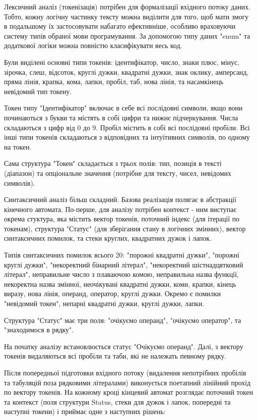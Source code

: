 \documentclass[14pt, a4paper]{extreport}
\begin{document}
	Лексичний аналіз (токенізація) потрібен для формалізації вхідного потоку даних. Тобто, кожну логічну частинку тексту можна виділити для того, щоб мати змогу в подальшому їх застосовувати набагато ефективніше, особливо враховуючи систему типів обраної мови програмування. За допомогою типу даних "enum" та додаткової логіки можна повністю класифікувати весь код.
	
	Були виділені основні типи токенів: ідентифікатор, число, знаки плюс, мінус, зірочка, слеш, відсоток, круглі дужки, квадратні дужки, знак оклику, амперсанд, пряма лінія, крапка, кома, лапки, пробіл, таб, нова лінія, та насамкінець невідомий тип токену.
	
	Токен типу "Ідентифікатор" включає в себе всі послідовні символи, якщо вони починаються з букви та містять в собі цифри та нижнє підчеркування. Числа складаються з цифр від 0 до 9. Пробіл містить в собі всі послідовні пробіли. Всі інші типи токенів складаються з відповідних та інтуїтивних символів, по одному на токен.
	
	Сама структура "Токен" складається з трьох полів: тип, позиція в тексті (діапазон) та опціональне значення (потрібне для тексту, чисел, невідомих символів).
	
	Синтаксичний аналіз більш складний. Базова реалізація полягає в абстракції кінечного автомата. По-перше, для аналізу потрібен контекст - ним виступає окрема стуктура, яка містить вектор токенів, поточний індекс (для ітерації по токенам), структура "Статус" (для зберігання стану в логічних змінних), вектор синтаксичних помилок, та стеки круглих, квадратних дужок і лапок.
	
	Типів синтаксичних помилок всього 20: "порожні квадратні дужки", "порожні круглі дужки", "некоректний бінарний літерал", "некоректний шістнадцятковий літерал", неправильне число з плаваючою комою, неправильна назва функції, некоректна назва змінної, неочікувані квадратні дужки, коми, крапки, кінець виразу, нова лінія, операнд, оператор, круглі дужки. Окремо є помилки "невідомий токен", непарні квадратні дужки, круглі дужки, лапки.
	
	Структура "Статус" має три поля: "очікуємо операнд", "очікуємо оператор", та "знаходимося в рядку".
	
	На початку аналізу встановлюється статус "Очікуємо операнд". Далі, з вектору токенів видаляються всі пробіли та таби, які не належать певному рядку.
	
	Після попередньої підготовки вхідного потоку (видалення непотрібних пробілів та табуляцій поза рядковими літералами) виконується поетапний лінійний прохід по вектору токенів. На кожному кроці кінцевий автомат розглядає поточний токен та контекст (поля структури Status, стеки для дужок і лапок, попередні та наступні токени) і приймає одне з наступних рішень:
	
\end{document}
